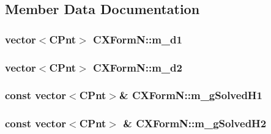 \subsection{Member Data Documentation}
\hypertarget{classCXFormN_ad563b4d395fbf65c10d0f4e90d8750d4}{
\subsubsection[{m\-\_\-d1}]{\setlength{\rightskip}{0pt plus 5cm}vector$<${\bf C\-Pnt}$>$ C\-X\-Form\-N\-::m\-\_\-d1\hspace{0.3cm}{\ttfamily [protected]}}}\label{classCXFormN_ad563b4d395fbf65c10d0f4e90d8750d4}
\hypertarget{classCXFormN_a490d5eaabe5bc880b43564059cda59b1}{
\subsubsection[{m\-\_\-d2}]{\setlength{\rightskip}{0pt plus 5cm}vector$<${\bf C\-Pnt}$>$ C\-X\-Form\-N\-::m\-\_\-d2\hspace{0.3cm}{\ttfamily [protected]}}}\label{classCXFormN_a490d5eaabe5bc880b43564059cda59b1}
\hypertarget{classCXFormN_aba7bfc6b31aed0aace8508eef8989c2a}{
\subsubsection[{m\-\_\-g\-Solved\-H1}]{\setlength{\rightskip}{0pt plus 5cm}const vector$<${\bf C\-Pnt}$>$\& C\-X\-Form\-N\-::m\-\_\-g\-Solved\-H1\hspace{0.3cm}{\ttfamily [protected]}}}\label{classCXFormN_aba7bfc6b31aed0aace8508eef8989c2a}
\hypertarget{classCXFormN_a0184838e6a610a6127060e2e6a2d6d76}{
\subsubsection[{m\-\_\-g\-Solved\-H2}]{\setlength{\rightskip}{0pt plus 5cm}const vector$<${\bf C\-Pnt}$>$ \& C\-X\-Form\-N\-::m\-\_\-g\-Solved\-H2\hspace{0.3cm}{\ttfamily [protected]}}}\label{classCXFormN_a0184838e6a610a6127060e2e6a2d6d76}
